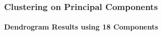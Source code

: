 \documentclass[10pt]{beamer}
\begin{document}
\begin{frame}[fragile]
\frametitle{Clustering on Principal Components}
\framesubtitle{Dendrogram Results using 18 Components}

\begin{center}
\end{center}
\end{frame}
\end{document}
